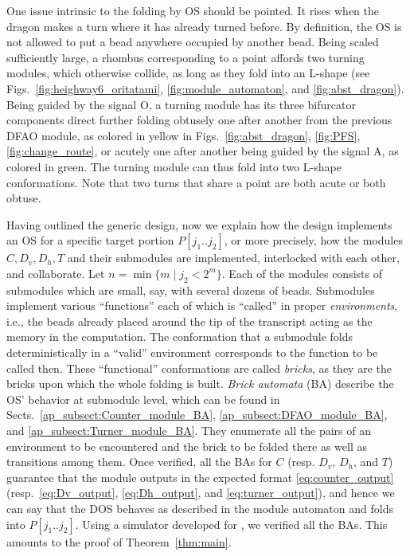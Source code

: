 \documentclass[runningheads]{llncs}
\begin{document}
One issue intrinsic to the folding by OS should be pointed. 
It rises when the dragon makes a turn where it has already turned before. %
By definition, the OS is not allowed to put a bead anywhere occupied by another bead. 
Being scaled sufficiently large, a rhombus corresponding to a point affords two turning modules, which otherwise collide, as long as they fold into an L-shape (see Figs.~\ref{fig:heighway6_oritatami}, \ref{fig:module_automaton}, and \ref{fig:abst_dragon}). 
Being guided by the signal O, a turning module has its three bifurcator components direct further folding obtusely one after another from the previous DFAO module, as colored in yellow in Figs.~\ref{fig:abst_dragon}, \ref{fig:PFS}, \ref{fig:change_route}, or acutely one after another being guided by the signal A, as colored in green. 
The turning module can thus fold into two L-shape conformations. 
Note that two turns that share a point are both acute or both obtuse. 

Having outlined the generic design, now we explain how the design implements an OS for a specific target portion $P[j_1 .. j_2]$, or more precisely, how the modules $C, D_v, D_h, T$ and their submodules are implemented, interlocked with each other, and collaborate. 
Let $n = \min\{m \mid j_2 < 2^m\}$. 
Each of the modules consists of submodules which are small, say, with several dozens of beads. 
Submodules implement various ``functions'' each of which is ``called'' in proper \textit{environments}, i.e., the beads already placed around the tip of the transcript acting as the memory in the computation. 
The conformation that a submodule folds deterministically in a ``valid'' environment corresponds to the function to be called then. 
These ``functional'' conformations are called \textit{bricks}, as they are the bricks upon which the whole folding is built. 
\textit{Brick automata} (BA) describe the OS' behavior at submodule level, which can be found in Sects.~\ref{ap_subsect:Counter_module_BA}, \ref{ap_subsect:DFAO_module_BA}, and \ref{ap_subsect:Turner_module_BA}.
They enumerate all the pairs of an environment to be encountered and the brick to be folded there as well as transitions among them. 
Once verified, all the BAs for $C$ (resp. $D_v$, $D_h$, and $T$) guarantee that the module outputs in the expected format \eqref{eq:counter_output} (resp.~\eqref{eq:Dv_output}, \eqref{eq:Dh_output}, and \eqref{eq:turner_output}), and hence we can say that the DOS behaves as described in the module automaton and folds into $P[j_1 .. j_2]$. 
Using a simulator developed for \cite{HaKiOtSe2016}, we verified all the BAs. 
This amounts to the proof of Theorem~\ref{thm:main}. 
\end{document}
